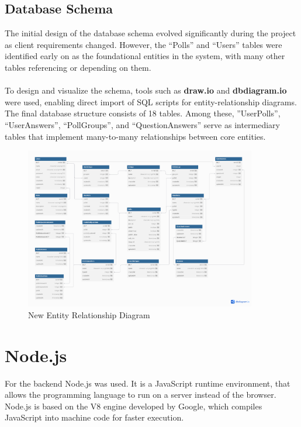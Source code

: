 \documentclass[a4paper,12pt]{report}
\begin{document}
\subsection{Database Schema}
The initial design of the database schema evolved significantly during the project as client requirements changed. However, the “Polls” and “Users” tables were identified early on as the foundational entities in the system, with many other tables referencing or depending on them.\\\\
To design and visualize the schema, tools such as \textbf{draw.io} and \textbf{dbdiagram.io} were used, enabling direct import of SQL scripts for entity-relationship diagrams. The final database structure consists of 18 tables. Among these, ”UserPolls”, “UserAnswers”, “PollGroups”, and “QuestionAnswers” serve as intermediary tables that implement many-to-many relationships between core entities.
\clearpage 
\begin{figure}[!htb]  
    \centering
    \includegraphics[width=0.9\textwidth]{pics/ERD_NEW.png}
    \caption{New Entity Relationship Diagram}
    \label{fig:new_ERD}
\end{figure}
\clearpage 

\section{Node.js}
For the backend Node.js was used. It is a JavaScript runtime environment, that allows the programming language to run on a server instead of the browser. Node.js is based on the V8 engine developed by Google, which compiles JavaScript into machine code for faster execution. \parencite{nodejs-intro} \\\\
\end{document}

